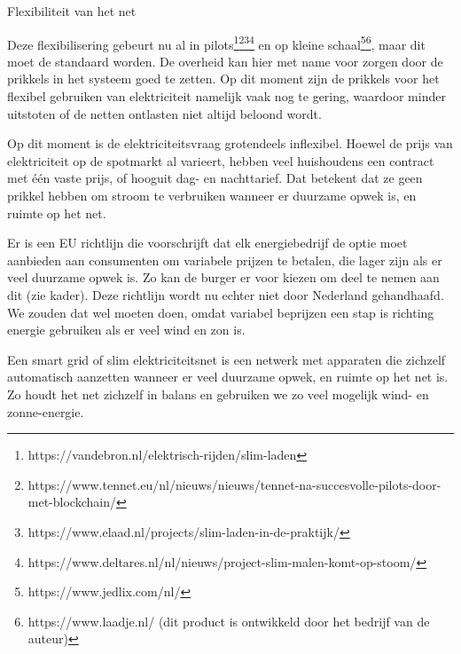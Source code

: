 \begin{voorstel}{Flexibiliteit van het net}
\begin{uitdaging}
Deze flexibilisering gebeurt nu al in pilots\footnote{https://vandebron.nl/elektrisch-rijden/slim-laden
}\footnote{https://www.tennet.eu/nl/nieuws/nieuws/tennet-na-succesvolle-pilots-door-met-blockchain/
}\footnote{https://www.elaad.nl/projects/slim-laden-in-de-praktijk/
}\footnote{https://www.deltares.nl/nl/nieuws/project-slim-malen-komt-op-stoom/} en op kleine schaal\footnote{https://www.jedlix.com/nl/}\footnote{https://www.laadje.nl/ (dit product is ontwikkeld door het bedrijf van de auteur)}, maar dit moet de standaard worden. De overheid kan hier met name voor zorgen door de prikkels in het systeem goed te zetten. Op dit moment zijn de prikkels voor het flexibel gebruiken van elektriciteit namelijk vaak nog te gering, waardoor minder \COO uitstoten of de netten ontlasten niet altijd beloond wordt. \end{uitdaging}

\begin{overwegingen}
Op dit moment is de elektriciteitsvraag grotendeels inflexibel. Hoewel de prijs van elektriciteit op de spotmarkt al varieert, hebben veel huishoudens een contract met één vaste prijs, of hooguit dag- en nachttarief. Dat betekent dat ze geen prikkel hebben om stroom te verbruiken wanneer er duurzame opwek is, en ruimte op het net.

Er is een EU richtlijn die voorschrijft dat elk energiebedrijf de optie moet aanbieden aan consumenten om variabele prijzen te betalen, die lager zijn als er veel duurzame opwek is. Zo kan de burger er voor kiezen om deel te nemen aan dit  (zie kader). Deze richtlijn wordt nu echter niet door Nederland gehandhaafd. We zouden dat wel moeten doen, omdat variabel beprijzen een stap is richting energie gebruiken als er veel wind en zon is.

\begin{infobox}{}
Een smart grid of slim elektriciteitsnet is een netwerk met apparaten die zichzelf automatisch aanzetten wanneer er veel duurzame opwek, en ruimte op het net is. Zo houdt het net zichzelf in balans en gebruiken we zo veel mogelijk wind- en zonne-energie.
\end{infobox}


\end{overwegingen}
\end{voorstel}
